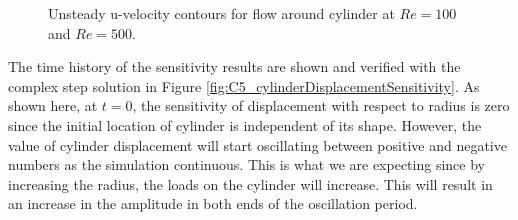 \begin{figure}[H]
    \quad
    \caption{Unsteady u-velocity contours for flow around cylinder at $Re = 100$ and $Re = 500$.}
    \label{fig:C5_cylinderFSIvelocity}
\end{figure}
%
The time history of the sensitivity results are shown and verified with the complex step solution in Figure \ref{fig:C5_cylinderDisplacementSensitivity}. As shown here, at $t=0$, the sensitivity of displacement with respect to radius is zero since the initial location of cylinder is independent of its shape. However, the value of cylinder displacement will start oscillating between positive and negative numbers as the simulation continuous. This is what we are expecting since by increasing the radius, the loads on the cylinder will increase. This will result in an increase in the amplitude in both ends of the oscillation period.
%
